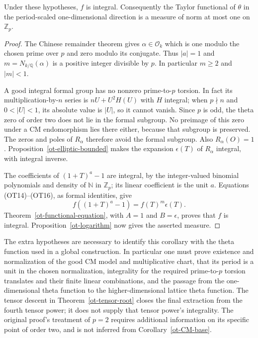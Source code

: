 \begin{corollary}\label{ot-CM-base}
Under these hypotheses, $f$ is integral.  Consequently the Taylor
functional of $\theta$ in the period-scaled one-dimensional
direction is a measure of norm at most one on $\mathbb Z_p$.
\end{corollary}
\begin{proof}
The Chinese remainder theorem gives
$\alpha\in\mathcal O_k$ which is one modulo the chosen prime
over $p$ and zero modulo its conjugate.  Thus $|a|=1$ and
$m=N_{k/\mathbb Q}(\alpha)$ is a positive integer divisible by
$p$.  In particular $m\ge2$ and $|m|<1$.

A good integral formal group has no nonzero prime-to-$p$ torsion.
In fact its multiplication-by-$n$ series is
$nU+U^2H(U)$ with $H$ integral; when $p\nmid n$ and
$0<|U|<1$, its absolute value is $|U|$, so it cannot vanish.
Since $p$ is odd, the theta zero of order two does not lie in the
formal subgroup.  No preimage of this zero under a CM
endomorphism lies there either, because that subgroup is
preserved.  The zeros and poles of $R_\alpha$ therefore avoid
the formal subgroup.  Also $R_\alpha(O)=1$.
Proposition~\ref{ot-elliptic-bounded} makes the expansion
$\epsilon(T)$ of $R_\alpha$ integral, with integral inverse.

The coefficients of $(1+T)^a-1$ are integral, by the
integer-valued binomial polynomials and density of $\mathbb N$
in $\mathbb Z_p$; its linear coefficient is the unit $a$.
Equations (OT14)--(OT16), as formal identities, give
\[
              f((1+T)^a-1)=f(T)^m\epsilon(T).
 \tag{OT17}
\]
Theorem~\ref{ot-functional-equation}, with $A=1$ and
$B=\epsilon$, proves that $f$ is integral.
Proposition~\ref{ot-logarithm} now gives the asserted measure.
\end{proof}

The extra hypotheses are necessary to identify this corollary with
the theta function used in a global construction.  In particular
one must prove existence and normalization of the good CM model
and multiplicative chart, that its period is a unit in the chosen
normalization, integrality for the required prime-to-$p$ torsion
translates and their finite linear combinations, and the passage
from the one-dimensional theta function to the higher-dimensional
lattice theta function.  The tensor descent in
Theorem~\ref{ot-tensor-root} closes the final extraction from the
fourth tensor power; it does not supply that tensor power's
integrality.  The original proof's treatment of $p=2$ requires
additional information on its specific point of order two, and
is not inferred from Corollary~\ref{ot-CM-base}.

